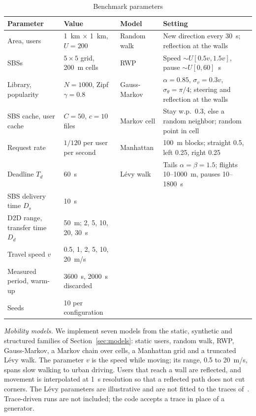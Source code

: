 \begin{table}[t]
\centering
\caption{Benchmark parameters}
\label{tab:params}
\footnotesize
\renewcommand{\arraystretch}{1.1}
\begin{tabular}{ll@{\hspace{0.6cm}}ll}
\hline
Parameter & Value & Model & Setting \\
\hline
Area, users & 1~km $\times$ 1~km, $U=200$ & Random walk & New direction every 30~s; reflection at the walls \\
SBSs & $5\times5$ grid, 200~m cells & RWP & Speed $\sim U[0.5v,1.5v]$, pause $\sim U[0,60]$~s \\
Library, popularity & $N=1000$, Zipf $\gamma=0.8$ & Gauss-Markov & $\alpha=0.85$, $\sigma_v=0.3v$, $\sigma_\theta=\pi/4$; steering and reflection at the walls \\
SBS cache, user cache & $C=50$, $c=10$ files & Markov cell & Stay w.p.\ 0.3, else a random neighbor; random point in cell \\
Request rate & $1/120$ per user per second & Manhattan & 100~m blocks; straight 0.5, left 0.25, right 0.25 \\
Deadline $T_d$ & 60~s & L\'evy walk & Tails $\alpha=\beta=1.5$; flights 10--1000~m, pauses 10--1800~s \\
SBS delivery time $D_s$ & 10~s & & \\
D2D range, transfer time $D_d$ & 50~m; 2, 5, 10, 20, 30~s & & \\
Travel speed $v$ & 0.5, 1, 2, 5, 10, 20~m/s & & \\
Measured period, warm-up & 3600~s, 2000~s discarded & & \\
Seeds & 10 per configuration & & \\
\hline
\end{tabular}
\end{table}

\emph{Mobility models.} We implement seven models from the static, synthetic and structured families of Section~\ref{sec:models}: static users, random walk, RWP, Gauss-Markov, a Markov chain over cells, a Manhattan grid and a truncated L\'evy walk. The parameter $v$ is the speed while moving; its range, 0.5 to 20~m/s, spans slow walking to urban driving. Users that reach a wall are reflected, and movement is interpolated at 1~s resolution so that a reflected path does not cut corners. The L\'evy parameters are illustrative and are not fitted to the traces of~\cite{rhee2011levy}. Trace-driven runs are not included; the code accepts a trace in place of a generator.

